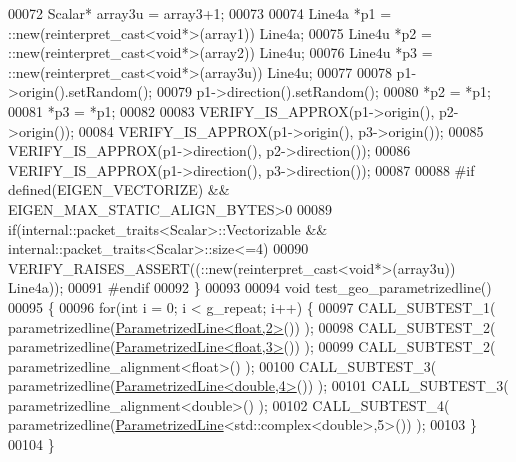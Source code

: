\begin{DoxyCode}
00072   Scalar* array3u = array3+1;
00073 
00074   Line4a *p1 = ::new(reinterpret\_cast<void*>(array1)) Line4a;
00075   Line4u *p2 = ::new(reinterpret\_cast<void*>(array2)) Line4u;
00076   Line4u *p3 = ::new(reinterpret\_cast<void*>(array3u)) Line4u;
00077   
00078   p1->origin().setRandom();
00079   p1->direction().setRandom();
00080   *p2 = *p1;
00081   *p3 = *p1;
00082 
00083   VERIFY\_IS\_APPROX(p1->origin(), p2->origin());
00084   VERIFY\_IS\_APPROX(p1->origin(), p3->origin());
00085   VERIFY\_IS\_APPROX(p1->direction(), p2->direction());
00086   VERIFY\_IS\_APPROX(p1->direction(), p3->direction());
00087   
00088 \textcolor{preprocessor}{  #if defined(EIGEN\_VECTORIZE) && EIGEN\_MAX\_STATIC\_ALIGN\_BYTES>0}
00089   \textcolor{keywordflow}{if}(internal::packet\_traits<Scalar>::Vectorizable && internal::packet\_traits<Scalar>::size<=4)
00090     VERIFY\_RAISES\_ASSERT((::\textcolor{keyword}{new}(reinterpret\_cast<void*>(array3u)) Line4a));
00091 \textcolor{preprocessor}{  #endif}
00092 \}
00093 
00094 \textcolor{keywordtype}{void} test\_geo\_parametrizedline()
00095 \{
00096   \textcolor{keywordflow}{for}(\textcolor{keywordtype}{int} i = 0; i < g\_repeat; i++) \{
00097     CALL\_SUBTEST\_1( parametrizedline(\hyperlink{group___geometry___module_class_eigen_1_1_parametrized_line}{ParametrizedLine<float,2>}()) );
00098     CALL\_SUBTEST\_2( parametrizedline(\hyperlink{group___geometry___module_class_eigen_1_1_parametrized_line}{ParametrizedLine<float,3>}()) );
00099     CALL\_SUBTEST\_2( parametrizedline\_alignment<float>() );
00100     CALL\_SUBTEST\_3( parametrizedline(\hyperlink{group___geometry___module_class_eigen_1_1_parametrized_line}{ParametrizedLine<double,4>}()) );
00101     CALL\_SUBTEST\_3( parametrizedline\_alignment<double>() );
00102     CALL\_SUBTEST\_4( parametrizedline(\hyperlink{group___geometry___module_class_eigen_1_1_parametrized_line}{ParametrizedLine}<std::complex<double>,5>()) );
00103   \}
00104 \}
\end{DoxyCode}
